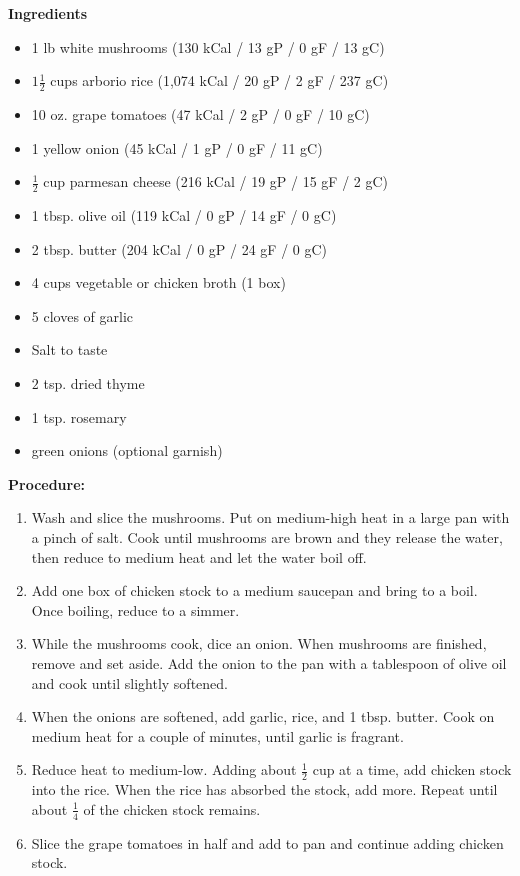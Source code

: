 \begin{multicols}{2}
\textbf{Ingredients}
\begin{itemize}
\item 1 lb white mushrooms \newline (130 kCal / 13 gP / 0 gF / 13 gC)
\item $1\frac{1}{2}$ cups arborio rice \quad (1,074 kCal / 20 gP / 2 gF / 237 gC)
\item 10 oz. grape tomatoes  \quad (47 kCal / 2 gP / 0 gF / 10 gC)
\item 1 yellow onion (45 kCal / 1 gP / 0 gF / 11 gC)
\item $\frac{1}{2}$ cup parmesan cheese \newline (216 kCal / 19 gP / 15 gF / 2 gC)
\item 1 tbsp. olive oil \newline (119 kCal / 0 gP / 14 gF / 0 gC)
\item 2 tbsp. butter \quad (204 kCal / 0 gP / 24 gF / 0 gC)
\item 4 cups vegetable or chicken broth (1 box)

\item 5 cloves of garlic
\item Salt to taste
\item $2$ tsp. dried thyme
\item 1 tsp. rosemary
\item green onions (optional garnish)




\end{itemize}


\columnbreak
\textbf{Procedure:}
\medskip


\begin{enumerate}

\item Wash and slice the mushrooms. Put on medium-high heat in a large pan with a pinch of salt. Cook until mushrooms are brown and they release the water, then reduce to medium heat and let the water boil off. 
\item Add one box of chicken stock to a medium saucepan and bring to a boil. Once boiling, reduce to a simmer. 
\item While the mushrooms cook, dice an onion. When mushrooms are finished, remove and set aside. Add the onion to the pan with a tablespoon of olive oil and cook until slightly softened. 
\item When the onions are softened, add garlic, rice, and 1 tbsp. butter. Cook on medium heat for a couple of minutes, until garlic is fragrant. 
\item Reduce heat to medium-low. Adding about $\frac{1}{2}$ cup at a time, add chicken stock into the rice. When the rice has absorbed the stock, add more. Repeat until about $\frac{1}{4}$ of the chicken stock remains. 
\item Slice the grape tomatoes in half and add to pan and continue adding chicken stock.


\end{enumerate}
\end{multicols}
